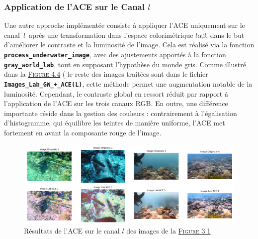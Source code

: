 \documentclass[10pt, a4paper]{extarticle}
\numberwithin{equation}{section}
\numberwithin{figure}{section}
\begin{document}
\subsubsection{Application de l'ACE sur le Canal \( l \)}

\par Une autre approche implémentée consiste à appliquer l'ACE uniquement sur le canal $\,l\,$ après une transformation dans l'espace colorimétrique $l\alpha\beta$, dans le but d'améliorer le contraste et la luminosité de l'image. Cela est réalisé via la fonction \colorbox{gray!15}{\texttt{\textbf{process\_underwater\_image}}}, avec des ajustements apportés à la fonction \colorbox{gray!15}{\texttt{\textbf{gray\_world\_lab}}}, tout en supposant l'hypothèse du monde gris. Comme illustré dans la \hyperref[figure4.4]{\textsc{Figure} 4.4} ( le reste des images traitées sont dans le fichier \colorbox{gray!15}{\texttt{\textbf{Images\_Lab\_GW\_+\_ACE(L)}}}, cette méthode permet une augmentation notable de la luminosité. Cependant, le contraste global en ressort réduit par rapport à l'application de l'ACE sur les trois canaux RGB. En outre, une différence importante réside dans la gestion des couleurs : contrairement à l'égalisation d'histogramme, qui équilibre les teintes de manière uniforme, l'ACE met fortement en avant la composante rouge de l'image. 

\begin{figure}[h!]
\begin{center}
\includegraphics[width=18cm]{image003.png}
\end{center}
\label{figure4.4}
\caption{Résultats de l'ACE sur le canal $l$ des images de la \hyperref[figure3.1]{\textsc{Figure} 3.1}}
\end{figure} 
\end{document}
